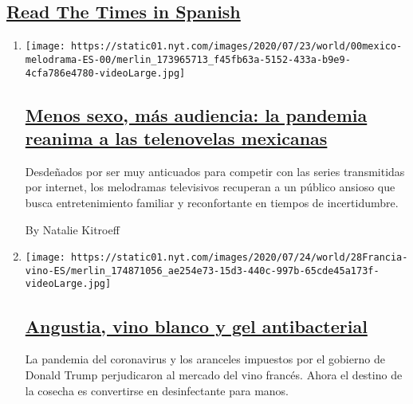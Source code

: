 \hypertarget{read-the-times-in-spanish}{%
\subsection{\texorpdfstring{\protect\hyperlink{}{Read The Times in
Spanish}}{Read The Times in Spanish}}\label{read-the-times-in-spanish}}

\begin{enumerate}
\def\labelenumi{\arabic{enumi}.}
\item
  \texttt{[image: https://static01.nyt.com/images/2020/07/23/world/00mexico-melodrama-ES-00/merlin\_173965713\_f45fb63a-5152-433a-b9e9-4cfa786e4780-videoLarge.jpg]}

  \hypertarget{menos-sexo-muxe1s-audiencia-la-pandemia-reanima-a-las-telenovelas-mexicanas}{%
  \subsection{\texorpdfstring{\href{/es/2020/08/02/espanol/america-latina/televisa-rosa-de-guadalupe-netflix.html}{Menos
  sexo, más audiencia: la pandemia reanima a las telenovelas
  mexicanas}}{Menos sexo, más audiencia: la pandemia reanima a las telenovelas mexicanas}}\label{menos-sexo-muxe1s-audiencia-la-pandemia-reanima-a-las-telenovelas-mexicanas}}

  Desdeñados por ser muy anticuados para competir con las series
  transmitidas por internet, los melodramas televisivos recuperan a un
  público ansioso que busca entretenimiento familiar y reconfortante en
  tiempos de incertidumbre.

  By Natalie Kitroeff
\item
  \texttt{[image: https://static01.nyt.com/images/2020/07/24/world/28Francia-vino-ES/merlin\_174871056\_ae254e73-15d3-440c-997b-65cde45a173f-videoLarge.jpg]}

  \hypertarget{angustia-vino-blanco-y-gel-antibacterial}{%
  \subsection{\texorpdfstring{\href{/es/2020/07/28/espanol/mundo/vino-blanco-alsacia-coronavirus.html}{Angustia,
  vino blanco y gel
  antibacterial}}{Angustia, vino blanco y gel antibacterial}}\label{angustia-vino-blanco-y-gel-antibacterial}}

  La pandemia del coronavirus y los aranceles impuestos por el gobierno
  de Donald Trump perjudicaron al mercado del vino francés. Ahora el
  destino de la cosecha es convertirse en desinfectante para manos.


\end{enumerate}
